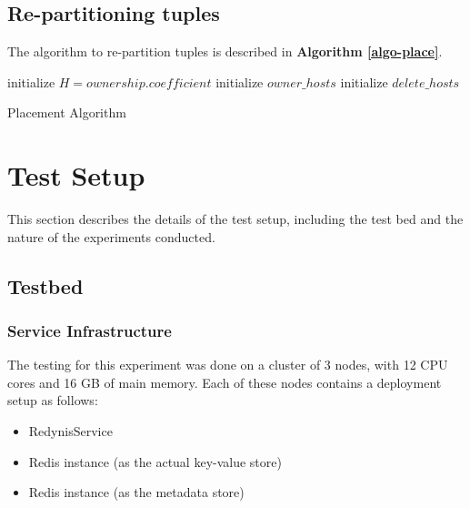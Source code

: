 \documentclass{sig-alternate}
\begin{document}
\subsection{Re-partitioning tuples}
The algorithm to re-partition tuples is described in \textbf{Algorithm \ref{algo-place}}.\\

\begin{algorithm}
\DontPrintSemicolon 
\;
initialize $H = ownership.coefficient$\;
initialize $owner\_hosts$\;
initialize $delete\_hosts$\;
\;

\label{algo-place}
\caption{Placement Algorithm}
\end{algorithm}


\section{Test Setup}
This section describes the details of the test setup, including the test bed and the nature of the experiments conducted.

\subsection{Testbed}

\subsubsection{Service Infrastructure} \label{Service-Infrastructure}
The testing for this experiment was done on a cluster of 3 nodes, with 12 CPU cores and 16 GB of main memory.
Each of these nodes contains a deployment setup as follows:
\begin{itemize}
	\item RedynisService \cite{redynis-svc}
	\item Redis instance (as the actual key-value store)
	\item Redis instance (as the metadata store)
\end{itemize}
\end{document}
